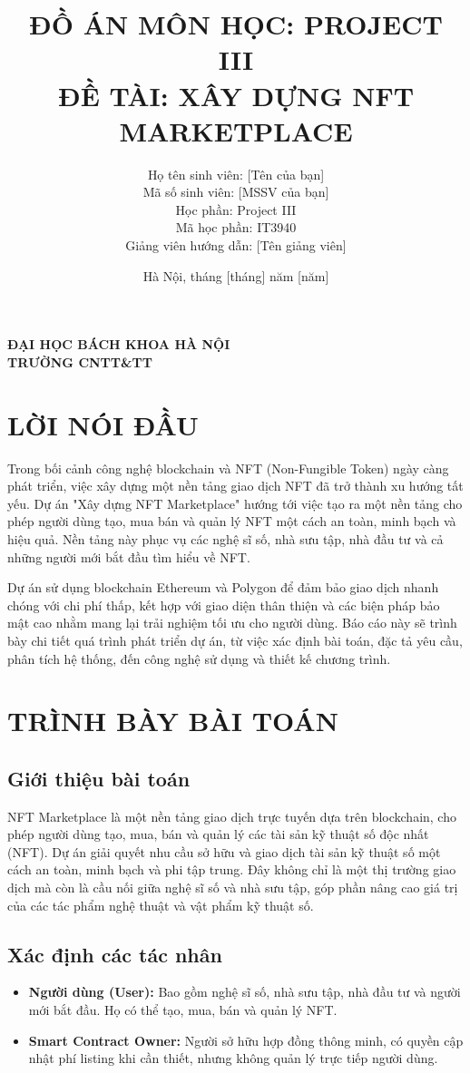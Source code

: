\documentclass[a4paper,12pt]{report}
\title{\textbf{ĐỒ ÁN MÔN HỌC: PROJECT III} \\ \textbf{ĐỀ TÀI: XÂY DỰNG NFT MARKETPLACE}}
\author{
    Họ tên sinh viên: [Tên của bạn] \\
    Mã số sinh viên: [MSSV của bạn] \\
    Học phần: Project III \\
    Mã học phần: IT3940 \\
    Giảng viên hướng dẫn: [Tên giảng viên]
}
\date{Hà Nội, tháng [tháng] năm [năm]}
\begin{document}
\maketitle
\begin{center}
    \textbf{ĐẠI HỌC BÁCH KHOA HÀ NỘI} \\
    \textbf{TRƯỜNG CNTT\&TT}
\end{center}

\tableofcontents
\newpage

\chapter{LỜI NÓI ĐẦU}
Trong bối cảnh công nghệ blockchain và NFT (Non-Fungible Token) ngày càng phát triển, việc xây dựng một nền tảng giao dịch NFT đã trở thành xu hướng tất yếu. Dự án "Xây dựng NFT Marketplace" hướng tới việc tạo ra một nền tảng cho phép người dùng tạo, mua bán và quản lý NFT một cách an toàn, minh bạch và hiệu quả. Nền tảng này phục vụ các nghệ sĩ số, nhà sưu tập, nhà đầu tư và cả những người mới bắt đầu tìm hiểu về NFT.

Dự án sử dụng blockchain Ethereum và Polygon để đảm bảo giao dịch nhanh chóng với chi phí thấp, kết hợp với giao diện thân thiện và các biện pháp bảo mật cao nhằm mang lại trải nghiệm tối ưu cho người dùng. Báo cáo này sẽ trình bày chi tiết quá trình phát triển dự án, từ việc xác định bài toán, đặc tả yêu cầu, phân tích hệ thống, đến công nghệ sử dụng và thiết kế chương trình.

\chapter{TRÌNH BÀY BÀI TOÁN}

\section{Giới thiệu bài toán}
NFT Marketplace là một nền tảng giao dịch trực tuyến dựa trên blockchain, cho phép người dùng tạo, mua, bán và quản lý các tài sản kỹ thuật số độc nhất (NFT). Dự án giải quyết nhu cầu sở hữu và giao dịch tài sản kỹ thuật số một cách an toàn, minh bạch và phi tập trung. Đây không chỉ là một thị trường giao dịch mà còn là cầu nối giữa nghệ sĩ số và nhà sưu tập, góp phần nâng cao giá trị của các tác phẩm nghệ thuật và vật phẩm kỹ thuật số.

\section{Xác định các tác nhân}
\begin{itemize}
    \item \textbf{Người dùng (User):} Bao gồm nghệ sĩ số, nhà sưu tập, nhà đầu tư và người mới bắt đầu. Họ có thể tạo, mua, bán và quản lý NFT.
    \item \textbf{Smart Contract Owner:} Người sở hữu hợp đồng thông minh, có quyền cập nhật phí listing khi cần thiết, nhưng không quản lý trực tiếp người dùng.
\end{itemize}
\end{document}
